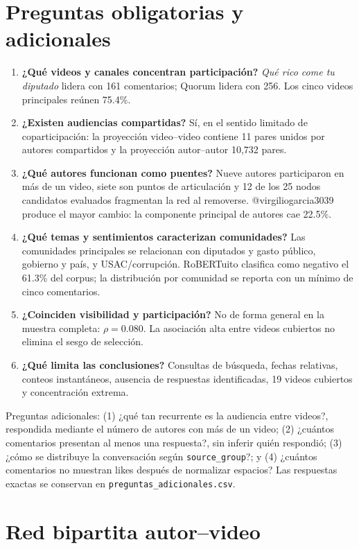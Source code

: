 \documentclass[11pt]{article}
\begin{document}
\section{Preguntas obligatorias y adicionales}

\begin{enumerate}
  \item \textbf{¿Qué videos y canales concentran participación?} \emph{Qué rico come tu diputado} lidera con 161 comentarios; Quorum lidera con 256. Los cinco videos principales reúnen 75.4\%.
  \item \textbf{¿Existen audiencias compartidas?} Sí, en el sentido limitado de coparticipación: la proyección video--video contiene 11 pares unidos por autores compartidos y la proyección autor--autor 10,732 pares.
  \item \textbf{¿Qué autores funcionan como puentes?} Nueve autores participaron en más de un video, siete son puntos de articulación y 12 de los 25 nodos candidatos evaluados fragmentan la red al removerse. @virgiliogarcia3039 produce el mayor cambio: la componente principal de autores cae 22.5\%.
  \item \textbf{¿Qué temas y sentimientos caracterizan comunidades?} Las comunidades principales se relacionan con diputados y gasto público, gobierno y país, y USAC/corrupción. RoBERTuito clasifica como negativo el 61.3\% del corpus; la distribución por comunidad se reporta con un mínimo de cinco comentarios.
  \item \textbf{¿Coinciden visibilidad y participación?} No de forma general en la muestra completa: $\rho=0.080$. La asociación alta entre videos cubiertos no elimina el sesgo de selección.
  \item \textbf{¿Qué limita las conclusiones?} Consultas de búsqueda, fechas relativas, conteos instantáneos, ausencia de respuestas identificadas, 19 videos cubiertos y concentración extrema.
\end{enumerate}

Preguntas adicionales: (1) ¿qué tan recurrente es la audiencia entre videos?, respondida mediante el número de autores con más de un video; (2) ¿cuántos comentarios presentan al menos una respuesta?, sin inferir quién respondió; (3) ¿cómo se distribuye la conversación según \texttt{source\_group}?; y (4) ¿cuántos comentarios no muestran likes después de normalizar espacios? Las respuestas exactas se conservan en \texttt{preguntas\_adicionales.csv}.

\section{Red bipartita autor--video}
\end{document}
